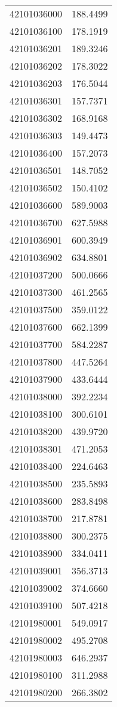 \begin{longtable}[t]{lr}
42101036000 & 188.4499\\
42101036100 & 178.1919\\
42101036201 & 189.3246\\
42101036202 & 178.3022\\
42101036203 & 176.5044\\
42101036301 & 157.7371\\
42101036302 & 168.9168\\
42101036303 & 149.4473\\
42101036400 & 157.2073\\
42101036501 & 148.7052\\
42101036502 & 150.4102\\
42101036600 & 589.9003\\
42101036700 & 627.5988\\
42101036901 & 600.3949\\
42101036902 & 634.8801\\
42101037200 & 500.0666\\
42101037300 & 461.2565\\
42101037500 & 359.0122\\
42101037600 & 662.1399\\
42101037700 & 584.2287\\
42101037800 & 447.5264\\
42101037900 & 433.6444\\
42101038000 & 392.2234\\
42101038100 & 300.6101\\
42101038200 & 439.9720\\
42101038301 & 471.2053\\
42101038400 & 224.6463\\
42101038500 & 235.5893\\
42101038600 & 283.8498\\
42101038700 & 217.8781\\
42101038800 & 300.2375\\
42101038900 & 334.0411\\
42101039001 & 356.3713\\
42101039002 & 374.6660\\
42101039100 & 507.4218\\
42101980001 & 549.0917\\
42101980002 & 495.2708\\
42101980003 & 646.2937\\
42101980100 & 311.2988\\
42101980200 & 266.3802\\

\end{longtable}

